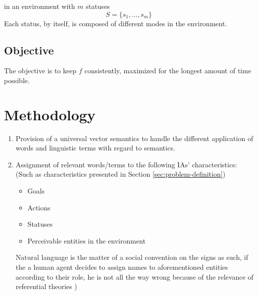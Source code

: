 \documentclass{article}
\begin{document}
\begin{multicols}{2}
				in an environment with $m$ statuses
				\begin{equation}
					S = \{s_1,...,s_m\}
					\label{eq:environment-statusess}
				\end{equation}
				Each status, by itself, is composed of different modes in the environment.
		
		\subsection{Objective}\label{sec:objective}
			The objective is to keep $f$ consistently, maximized for the longest amount of time possible.
			
	\section{Methodology}\label{sec:methodology}
		\begin{enumerate}
			\item Provision of a universal vector semantics to handle the different application of words and linguistic terms with regard to semantics. 
			
			\item Assignment of relevant words/terms to the following IAs' characteristics: (Such as characteristics presented in Section \ref{sec:problem-definition})
				\begin{itemize}
					\item Goals
					\item Actions
					\item Statuses
					\item Perceivable entities in the environment
				\end{itemize}
			Natural language is the matter of a social convention on the signs \cite{saussure-2011-course-in-general-linguistics-translated-by-wade-baskin-edited-by-perry-meisel-and-haun-saussy} as such, if the a human agent decides to assign names to aforementioned entities according to their role, he is not all the way wrong because of the relevance of referential theories \citep{dickie-2015-fixing-reference})
			

\end{enumerate}
\end{multicols}
\end{document}

